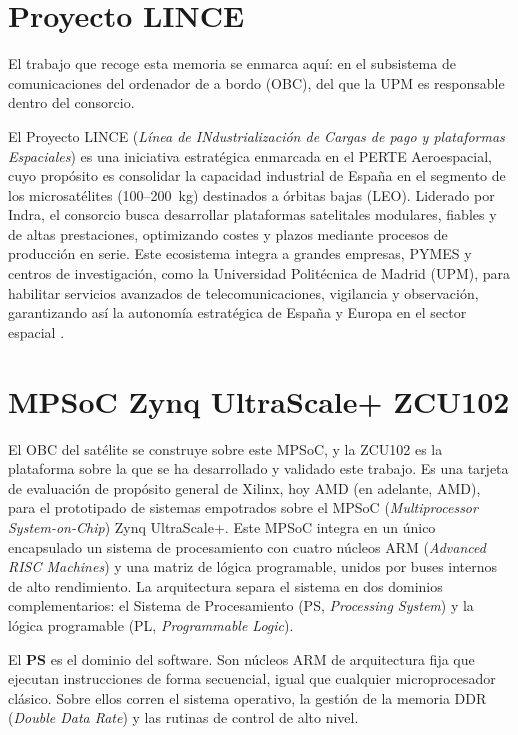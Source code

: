 \section{Proyecto LINCE}

El trabajo que recoge esta memoria se enmarca aquí: en el subsistema de comunicaciones del
ordenador de a bordo (OBC), del que la UPM es responsable dentro del consorcio.

El Proyecto LINCE (\textit{Línea de INdustrialización de Cargas de pago y plataformas Espaciales}) es
una iniciativa estratégica enmarcada en el PERTE Aeroespacial, cuyo propósito es consolidar
la capacidad industrial de España en el segmento de los microsatélites (100--200~kg)
destinados a órbitas bajas (LEO). Liderado por Indra, el consorcio busca desarrollar
plataformas satelitales modulares, fiables y de altas prestaciones, optimizando costes y
plazos mediante procesos de producción en serie. Este ecosistema integra a grandes
empresas, PYMES y centros de investigación, como la Universidad Politécnica de Madrid
(UPM), para habilitar servicios avanzados de telecomunicaciones, vigilancia y observación,
garantizando así la autonomía estratégica de España y Europa en el sector espacial
\cite{indra2026lince}.

\section{MPSoC Zynq UltraScale+ ZCU102}

El OBC del satélite se construye sobre este MPSoC, y la ZCU102 es la plataforma sobre la que se
ha desarrollado y validado este trabajo. Es una tarjeta de evaluación de propósito general de Xilinx, hoy AMD (en adelante, AMD), para el prototipado de
sistemas empotrados sobre el MPSoC (\textit{Multiprocessor System-on-Chip}) Zynq UltraScale+.
Este MPSoC integra en un único encapsulado un sistema de procesamiento con cuatro núcleos ARM
(\textit{Advanced RISC Machines}) y una matriz de lógica programable, unidos por buses internos de
alto rendimiento. La arquitectura
separa el sistema en dos dominios complementarios: el Sistema de Procesamiento (PS,
\textit{Processing System}) y la lógica programable (PL, \textit{Programmable Logic}).

El \textbf{PS} es el dominio del software. Son núcleos ARM de arquitectura fija que ejecutan
instrucciones de forma secuencial, igual que cualquier microprocesador clásico. Sobre ellos
corren el sistema operativo, la gestión de la memoria DDR (\textit{Double Data Rate}) y las
rutinas de control de alto nivel.

